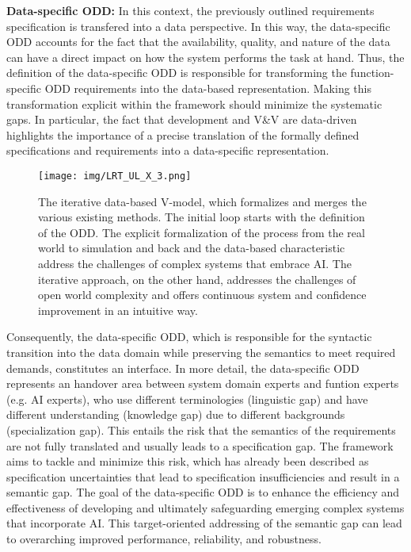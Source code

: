 \textbf{Data-specific ODD:} In this context, the previously outlined requirements specification is transfered into a data perspective. In this way, the data-specific ODD accounts for the fact that the availability, quality, and nature of the data can have a direct impact on how the system performs the task at hand. Thus, the definition of the data-specific ODD is responsible
for transforming the function-specific ODD requirements into the data-based representation. Making this transformation explicit within the framework should minimize the systematic gaps. In particular, the fact that development and V\&V are data-driven highlights the importance of a precise translation of the formally defined specifications and requirements into a data-specific representation.

\begin{figure*}[]
	\centering	
	\texttt{[image: img/LRT\_UL\_X\_3.png]}
	\caption{The iterative data-based V-model, which formalizes and merges the various existing methods. The initial loop starts with the definition of the ODD. The explicit formalization of the process from the real world to simulation and back and the data-based characteristic address the challenges of complex systems that embrace AI. The iterative approach, on the other hand, addresses the challenges of open world complexity and offers continuous system and confidence improvement in an intuitive way.}
	\label{fig:ours}
\end{figure*} 

Consequently, the data-specific ODD, which is responsible for the syntactic transition into the data domain while preserving the semantics to meet required demands, constitutes an interface. In more detail, the data-specific ODD represents an handover area between system domain experts and funtion experts (e.g. AI experts), who use different terminologies (linguistic gap) and have different understanding (knowledge gap) due to different backgrounds (specialization gap). This entails the risk that the semantics of the requirements are not fully translated and usually leads to a specification gap. The framework aims to tackle and minimize this risk, which has already been described as specification uncertainties \cite{burton2023closing} that lead to specification insufficiencies \cite{burton2023addressing} and result in a semantic gap. The goal of the data-specific ODD is to enhance the efficiency and effectiveness of developing and ultimately safeguarding emerging complex systems that incorporate AI. This target-oriented addressing of the semantic gap can lead to overarching improved performance, reliability, and robustness.

